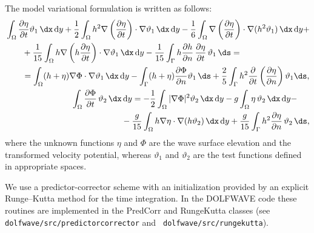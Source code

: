 The model variational formulation is written as follows:
\begin{subequations}\label{eq:lopes:varform}
\begin{align}
\begin{split}
&\displaystyle \int_\Omega\frac{\partial \eta}{\partial t}\vartheta_1\, \dx\, \mathrm{d}y
  +\frac{1}{2}\int_\Omega
  h^2\nabla\left(\frac{\partial \eta}{\partial t}\right)\cdot\nabla\vartheta_1\,
  \dx\, \mathrm{d}y- \frac{1}{6}\int_\Omega \nabla\left(
  \frac{\partial \eta}{\partial t}\right)\cdot\nabla(h^2\vartheta_1)\,
  \dx\, \mathrm{d}y+\\ &\quad \quad\displaystyle +
  \frac{1}{15}\int_\Omega
  h\nabla\left(h\frac{\partial \eta}{\partial t}\right)\cdot
  \nabla\vartheta_1\, \dx\, \mathrm{d}y- \frac{1}{15}\int_\Gamma
  h\frac{\partial h}{\partial n}\,\frac{\partial \eta}{\partial t}\,\vartheta_1\, \ds=
  \\ &\quad\quad=\displaystyle
  \int_\Omega(h+\eta)\nabla\Phi\cdot\nabla\vartheta_1\,
  \dx\, \mathrm{d}y -\int_\Gamma(h+\eta)\frac{\partial \Phi}{\partial n}\vartheta_1\, \ds
  +\frac{2}{5}\int_\Gamma
  h^2\frac{\partial }{\partial t}\left(\frac{\partial \eta}{\partial n}\right)\vartheta_1 \ds,
\vspace{0.3cm}
\end{split} \\
\begin{split}
&\displaystyle \int_\Omega \frac{\partial \Phi}{\partial t}\,\vartheta_2\,
  \dx\, \mathrm{d}y= -\frac{1}{2}\int_\Omega|\nabla\Phi|^2\vartheta_2\,
  \dx\, \mathrm{d}y -g\int_\Omega \eta\,\vartheta_2\,
  \dx\, \mathrm{d}y-\\ &\qquad\qquad\qquad\displaystyle-\frac{g}{15}\int_\Omega
  h\nabla\eta\cdot\nabla(h\vartheta_2)\, \dx\, \mathrm{d}y
  +\frac{g}{15}\int_\Gamma h^2\frac{\partial \eta}{\partial n}\,\vartheta_2\,
  \ds,
\end{split}
\end{align}
\end{subequations}
where the unknown functions $\eta$ and $\Phi$ are the wave
surface elevation and the transformed velocity potential,
whereas $\vartheta_1$ and $\vartheta_2$ are the test
functions defined in appropriate spaces.

We use a predictor-corrector 
scheme with an initialization provided by an explicit
Runge--Kutta method for the time
integration. In the DOLFWAVE code these routines are
implemented in the PredCorr and RungeKutta classes (see {\tt
  dolfwave/src/predictorcorrector} and {\tt
  dolfwave/src/rungekutta}).

